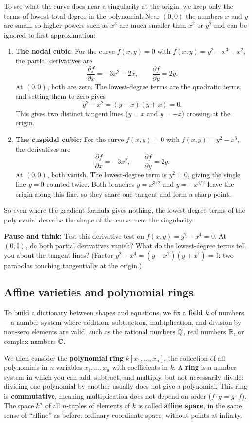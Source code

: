 To see what the curve does near a singularity at the origin, we keep only the terms of lowest total degree in the polynomial. Near $(0,0)$ the numbers $x$ and $y$ are small, so higher powers such as $x^3$ are much smaller than $x^2$ or $y^2$ and can be ignored to first approximation:
\begin{enumerate}
\item \textbf{The nodal cubic}: For the curve $f(x, y) = 0$ with $f(x, y) = y^2 - x^3 - x^2$, the partial derivatives are
\[
\frac{\partial f}{\partial x} = -3x^2 - 2x, \qquad \frac{\partial f}{\partial y} = 2y.
\]
At $(0, 0)$, both are zero. The lowest-degree terms are the quadratic terms, and setting them to zero gives
\[
y^2 - x^2 = (y - x)(y + x) = 0.
\]
This gives two distinct tangent lines ($y = x$ and $y = -x$) crossing at the origin.
\item \textbf{The cuspidal cubic}: For the curve $f(x, y) = 0$ with $f(x, y) = y^2 - x^3$, the derivatives are
\[
\frac{\partial f}{\partial x} = -3x^2, \qquad \frac{\partial f}{\partial y} = 2y.
\]
At $(0, 0)$, both vanish. The lowest-degree term is $y^2 = 0$, giving the single line $y = 0$ counted twice. Both branches $y = x^{3/2}$ and $y = -x^{3/2}$ leave the origin along this line, so they share one tangent and form a sharp point.
\end{enumerate}
So even where the gradient formula gives nothing, the lowest-degree terms of the polynomial describe the shape of the curve near the singularity.

\begin{recoverybox}
\textbf{Pause and think:} Test this derivative test on $f(x, y) = y^2 - x^4 = 0$. At $(0, 0)$, do both partial derivatives vanish? What do the lowest-degree terms tell you about the tangent lines? (Factor $y^2 - x^4 = (y - x^2)(y + x^2) = 0$: two parabolas touching tangentially at the origin.)
\end{recoverybox}

\subsection{Affine varieties and polynomial rings}

To build a dictionary between shapes and equations, we fix a \textbf{field} $k$ of numbers---a number system where addition, subtraction, multiplication, and division by non-zero elements are valid, such as the rational numbers $\mathbb{Q}$, real numbers $\mathbb{R}$, or complex numbers $\mathbb{C}$.

We then consider the \textbf{polynomial ring} $k[x_1, \dots, x_n]$, the collection of all polynomials in $n$ variables $x_1, \dots, x_n$ with coefficients in $k$. A \textbf{ring} is a number system in which you can add, subtract, and multiply, but not necessarily divide: dividing one polynomial by another usually does not give a polynomial. This ring is \textbf{commutative}, meaning multiplication does not depend on order ($f \cdot g = g \cdot f$). The space $k^n$ of all $n$-tuples of elements of $k$ is called \textbf{affine space}, in the same sense of ``affine'' as before: ordinary coordinate space, without points at infinity.


